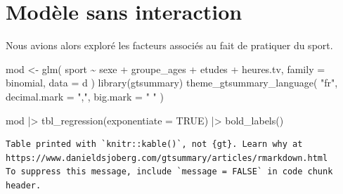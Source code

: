 \documentclass[
  letterpaper,
  DIV=11,
  numbers=noendperiod,
  oneside]{scrreprt}
\newenvironment{Shaded}{\begin{snugshade}}{\end{snugshade}}
\newcommand{\AttributeTok}[1]{\textcolor[rgb]{0.40,0.45,0.13}{#1}}
\newcommand{\ConstantTok}[1]{\textcolor[rgb]{0.56,0.35,0.01}{#1}}
\newcommand{\FunctionTok}[1]{\textcolor[rgb]{0.28,0.35,0.67}{#1}}
\newcommand{\NormalTok}[1]{\textcolor[rgb]{0.00,0.23,0.31}{#1}}
\newcommand{\OtherTok}[1]{\textcolor[rgb]{0.00,0.23,0.31}{#1}}
\newcommand{\SpecialCharTok}[1]{\textcolor[rgb]{0.37,0.37,0.37}{#1}}
\newcommand{\StringTok}[1]{\textcolor[rgb]{0.13,0.47,0.30}{#1}}
\begin{document}
\hypertarget{moduxe8le-sans-interaction}{%
\section{Modèle sans interaction}\label{moduxe8le-sans-interaction}}

Nous avions alors exploré les facteurs associés au fait de pratiquer du
sport.

\begin{Shaded}
\begin{Highlighting}[]
\NormalTok{mod }\OtherTok{\textless{}{-}} \FunctionTok{glm}\NormalTok{(}
\NormalTok{  sport }\SpecialCharTok{\textasciitilde{}}\NormalTok{ sexe }\SpecialCharTok{+}\NormalTok{ groupe\_ages }\SpecialCharTok{+}\NormalTok{ etudes }\SpecialCharTok{+}\NormalTok{ heures.tv,}
  \AttributeTok{family =}\NormalTok{ binomial,}
  \AttributeTok{data =}\NormalTok{ d}
\NormalTok{)}
\FunctionTok{library}\NormalTok{(gtsummary)}
\FunctionTok{theme\_gtsummary\_language}\NormalTok{(}
  \StringTok{"fr"}\NormalTok{,}
  \AttributeTok{decimal.mark =} \StringTok{","}\NormalTok{,}
  \AttributeTok{big.mark =} \StringTok{" "}
\NormalTok{)}
\end{Highlighting}
\end{Shaded}

\begin{Shaded}
\begin{Highlighting}[]
\NormalTok{mod }\SpecialCharTok{|\textgreater{}} 
  \FunctionTok{tbl\_regression}\NormalTok{(}\AttributeTok{exponentiate =} \ConstantTok{TRUE}\NormalTok{) }\SpecialCharTok{|\textgreater{}} 
  \FunctionTok{bold\_labels}\NormalTok{()}
\end{Highlighting}
\end{Shaded}

\begin{verbatim}
Table printed with `knitr::kable()`, not {gt}. Learn why at
https://www.danieldsjoberg.com/gtsummary/articles/rmarkdown.html
To suppress this message, include `message = FALSE` in code chunk header.
\end{verbatim}
\end{document}
